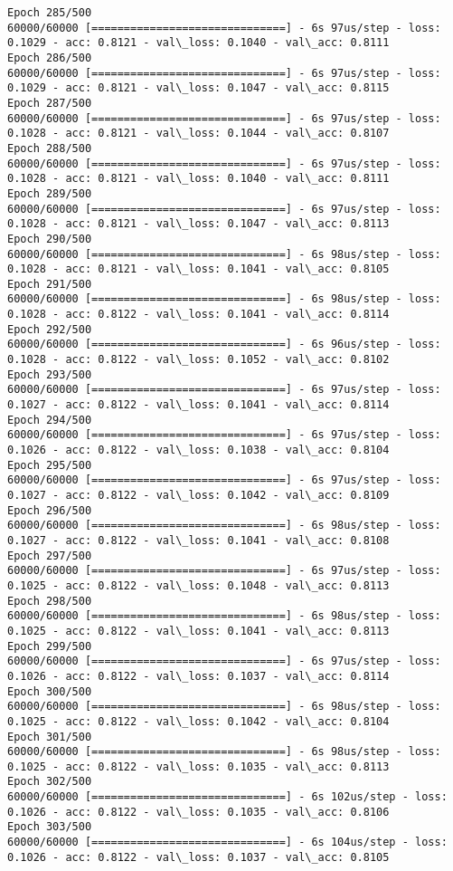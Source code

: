 \documentclass[11pt]{article}
\begin{document}
\begin{Verbatim}[commandchars=\\\{\}]
Epoch 285/500
60000/60000 [==============================] - 6s 97us/step - loss: 0.1029 - acc: 0.8121 - val\_loss: 0.1040 - val\_acc: 0.8111
Epoch 286/500
60000/60000 [==============================] - 6s 97us/step - loss: 0.1029 - acc: 0.8121 - val\_loss: 0.1047 - val\_acc: 0.8115
Epoch 287/500
60000/60000 [==============================] - 6s 97us/step - loss: 0.1028 - acc: 0.8121 - val\_loss: 0.1044 - val\_acc: 0.8107
Epoch 288/500
60000/60000 [==============================] - 6s 97us/step - loss: 0.1028 - acc: 0.8121 - val\_loss: 0.1040 - val\_acc: 0.8111
Epoch 289/500
60000/60000 [==============================] - 6s 97us/step - loss: 0.1028 - acc: 0.8121 - val\_loss: 0.1047 - val\_acc: 0.8113
Epoch 290/500
60000/60000 [==============================] - 6s 98us/step - loss: 0.1028 - acc: 0.8121 - val\_loss: 0.1041 - val\_acc: 0.8105
Epoch 291/500
60000/60000 [==============================] - 6s 98us/step - loss: 0.1028 - acc: 0.8122 - val\_loss: 0.1041 - val\_acc: 0.8114
Epoch 292/500
60000/60000 [==============================] - 6s 96us/step - loss: 0.1028 - acc: 0.8122 - val\_loss: 0.1052 - val\_acc: 0.8102
Epoch 293/500
60000/60000 [==============================] - 6s 97us/step - loss: 0.1027 - acc: 0.8122 - val\_loss: 0.1041 - val\_acc: 0.8114
Epoch 294/500
60000/60000 [==============================] - 6s 97us/step - loss: 0.1026 - acc: 0.8122 - val\_loss: 0.1038 - val\_acc: 0.8104
Epoch 295/500
60000/60000 [==============================] - 6s 97us/step - loss: 0.1027 - acc: 0.8122 - val\_loss: 0.1042 - val\_acc: 0.8109
Epoch 296/500
60000/60000 [==============================] - 6s 98us/step - loss: 0.1027 - acc: 0.8122 - val\_loss: 0.1041 - val\_acc: 0.8108
Epoch 297/500
60000/60000 [==============================] - 6s 97us/step - loss: 0.1025 - acc: 0.8122 - val\_loss: 0.1048 - val\_acc: 0.8113
Epoch 298/500
60000/60000 [==============================] - 6s 98us/step - loss: 0.1025 - acc: 0.8122 - val\_loss: 0.1041 - val\_acc: 0.8113
Epoch 299/500
60000/60000 [==============================] - 6s 97us/step - loss: 0.1026 - acc: 0.8122 - val\_loss: 0.1037 - val\_acc: 0.8114
Epoch 300/500
60000/60000 [==============================] - 6s 98us/step - loss: 0.1025 - acc: 0.8122 - val\_loss: 0.1042 - val\_acc: 0.8104
Epoch 301/500
60000/60000 [==============================] - 6s 98us/step - loss: 0.1025 - acc: 0.8122 - val\_loss: 0.1035 - val\_acc: 0.8113
Epoch 302/500
60000/60000 [==============================] - 6s 102us/step - loss: 0.1026 - acc: 0.8122 - val\_loss: 0.1035 - val\_acc: 0.8106
Epoch 303/500
60000/60000 [==============================] - 6s 104us/step - loss: 0.1026 - acc: 0.8122 - val\_loss: 0.1037 - val\_acc: 0.8105

\end{Verbatim}
\end{document}
